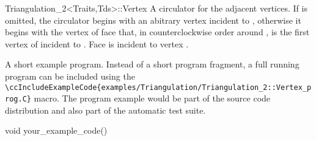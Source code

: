 \begin{ccRefClass}{Triangulation_2<Traits,Tds>::Vertex}
{A circulator for the adjacent vertices.
If  is omitted, the circulator begins with
 an abitrary vertex incident
to , otherwise it begins with the
vertex of face  that, 
in counterclockwise order around ,
is the first vertex of  incident to .
\ccPrecond Face  is incident to vertex .}


\ccSeeAlso
{}


\ccExample

A short example program.
Instead of a short program fragment, a full running program can be
included using the 
\verb|\ccIncludeExampleCode{examples/Triangulation/Triangulation_2::Vertex_prog.C}| 
macro. The program example would be part of the source code distribution and
also part of the automatic test suite.

\begin{ccExampleCode}
void your_example_code() {
}
\end{ccExampleCode}


\end{ccRefClass}



